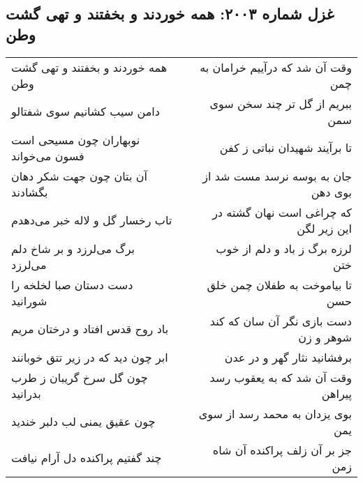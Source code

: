 \begin{center}
\section*{غزل شماره ۲۰۰۳: همه خوردند و بخفتند و تهی گشت وطن}
\label{sec:2003}
\begin{longtable}{l p{0.5cm} r}
همه خوردند و بخفتند و تهی گشت وطن
&&
وقت آن شد که درآییم خرامان به چمن
\\
دامن سیب کشانیم سوی شفتالو
&&
ببریم از گل تر چند سخن سوی سمن
\\
نوبهاران چون مسیحی است فسون می‌خواند
&&
تا برآیند شهیدان نباتی ز کفن
\\
آن بتان چون جهت شکر دهان بگشادند
&&
جان به بوسه نرسد مست شد از بوی دهن
\\
تاب رخسار گل و لاله خبر می‌دهدم
&&
که چراغی است نهان گشته در این زیر لگن
\\
برگ می‌لرزد و بر شاخ دلم می‌لرزد
&&
لرزه برگ ز باد و دلم از خوب ختن
\\
دست دستان صبا لخلخه را شورانید
&&
تا بیاموخت به طفلان چمن خلق حسن
\\
باد روح قدس افتاد و درختان مریم
&&
دست بازی نگر آن سان که کند شوهر و زن
\\
ابر چون دید که در زیر تتق خوبانند
&&
برفشانید نثار گهر و در عدن
\\
چون گل سرخ گریبان ز طرب بدرانید
&&
وقت آن شد که به یعقوب رسد پیراهن
\\
چون عقیق یمنی لب دلبر خندید
&&
بوی یزدان به محمد رسد از سوی یمن
\\
چند گفتیم پراکنده دل آرام نیافت
&&
جز بر آن زلف پراکنده آن شاه زمن
\\
\end{longtable}
\end{center}
